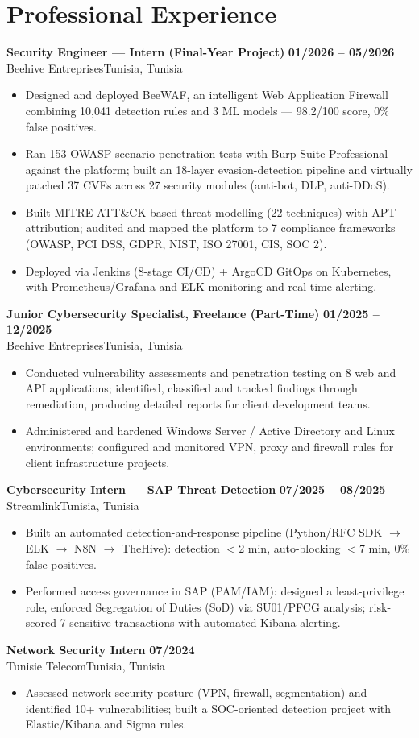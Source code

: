 \documentclass[a4paper,10pt]{article}
\newcommand{\cventry}[4]{\textbf{#1} \hfill \textbf{#4}\\[0.5pt]#2{\ifx\relax#3\relax\else, #3\fi}\par\vspace{0.8pt}}
\begin{document}
\section{Professional Experience}
\cventry{Security Engineer --- Intern (Final-Year Project)}{Beehive Entreprises}{Tunisia}{01/2026 -- 05/2026}
\begin{itemize}
  \item Designed and deployed BeeWAF, an intelligent Web Application Firewall combining 10,041 detection rules and 3 ML models --- 98.2/100 score, 0\% false positives.
  \item Ran 153 OWASP-scenario penetration tests with Burp Suite Professional against the platform; built an 18-layer evasion-detection pipeline and virtually patched 37 CVEs across 27 security modules (anti-bot, DLP, anti-DDoS).
  \item Built MITRE ATT\&CK-based threat modelling (22 techniques) with APT attribution; audited and mapped the platform to 7 compliance frameworks (OWASP, PCI DSS, GDPR, NIST, ISO 27001, CIS, SOC 2).
  \item Deployed via Jenkins (8-stage CI/CD) + ArgoCD GitOps on Kubernetes, with Prometheus/Grafana and ELK monitoring and real-time alerting.
\end{itemize}
\cventry{Junior Cybersecurity Specialist, Freelance (Part-Time)}{Beehive Entreprises}{Tunisia}{01/2025 -- 12/2025}
\begin{itemize}
  \item Conducted vulnerability assessments and penetration testing on 8 web and API applications; identified, classified and tracked findings through remediation, producing detailed reports for client development teams.
  \item Administered and hardened Windows Server / Active Directory and Linux environments; configured and monitored VPN, proxy and firewall rules for client infrastructure projects.
\end{itemize}
\cventry{Cybersecurity Intern --- SAP Threat Detection}{Streamlink}{Tunisia}{07/2025 -- 08/2025}
\begin{itemize}
  \item Built an automated detection-and-response pipeline (Python/RFC SDK $\to$ ELK $\to$ N8N $\to$ TheHive): detection $<$2 min, auto-blocking $<$7 min, 0\% false positives.
  \item Performed access governance in SAP (PAM/IAM): designed a least-privilege role, enforced Segregation of Duties (SoD) via SU01/PFCG analysis; risk-scored 7 sensitive transactions with automated Kibana alerting.
\end{itemize}
\cventry{Network Security Intern}{Tunisie Telecom}{Tunisia}{07/2024}
\begin{itemize}
  \item Assessed network security posture (VPN, firewall, segmentation) and identified 10+ vulnerabilities; built a SOC-oriented detection project with Elastic/Kibana and Sigma rules.
\end{itemize}
\end{document}
